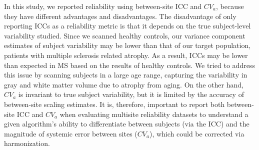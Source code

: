 In this study, we reported reliability using between-site ICC and $CV_{a}$, because they have different advantages and disadvantages. The disadvantage of only reporting ICCs as a reliability metric is that it depends on the true subject-level variability studied. Since we scanned healthy controls, our variance component estimates of subject variability may be lower than that of our target population, patients with multiple sclerosis related atrophy. As a result, ICCs may be lower than expected in MS based on the results of healthy controls. We tried to address this issue by scanning subjects in a large age range, capturing the variability in gray and white matter volume due to atrophy from aging. On the other hand, $CV_{a}$ is invariant to true subject variability, but it is limited by the accuracy of between-site scaling estimates. It is, therefore, important to report both between-site ICC and $CV_{a}$ when evaluating multisite reliability datasets to understand a given algorithm's ability to differentiate between subjects (via the ICC) and the magnitude of systemic error between sites ($CV_{a}$), which could be corrected via harmonization.